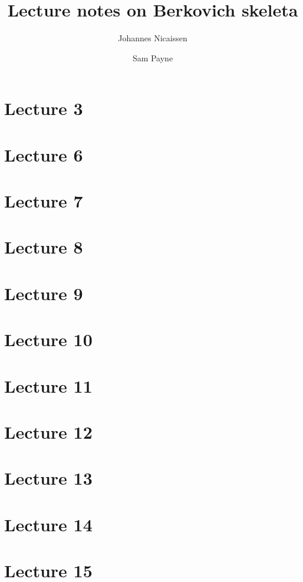 \documentclass[10pt,a4paper]{article}
\title{Lecture notes on Berkovich skeleta}
\author{Johannes Nicaissen \and Sam Payne}
\numberwithin{equation}{section}
\begin{document}
\maketitle




\section{Lecture 3}




\section{Lecture 6}
\section{Lecture 7}
\section{Lecture 8}
\section{Lecture 9}
\section{Lecture 10}
\section{Lecture 11}
\section{Lecture 12}
\section{Lecture 13}
\section{Lecture 14}
\section{Lecture 15}
\end{document}
